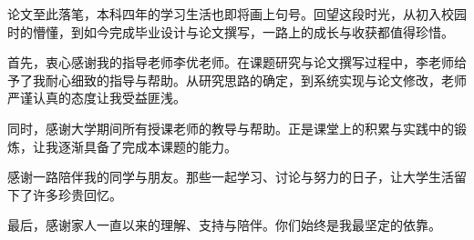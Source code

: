 论文至此落笔，本科四年的学习生活也即将画上句号。回望这段时光，从初入校园时的懵懂，到如今完成毕业设计与论文撰写，一路上的成长与收获都值得珍惜。

首先，衷心感谢我的指导老师李优老师。在课题研究与论文撰写过程中，李老师给予了我耐心细致的指导与帮助。从研究思路的确定，到系统实现与论文修改，老师严谨认真的态度让我受益匪浅。

同时，感谢大学期间所有授课老师的教导与帮助。正是课堂上的积累与实践中的锻炼，让我逐渐具备了完成本课题的能力。

感谢一路陪伴我的同学与朋友。那些一起学习、讨论与努力的日子，让大学生活留下了许多珍贵回忆。

最后，感谢家人一直以来的理解、支持与陪伴。你们始终是我最坚定的依靠。
